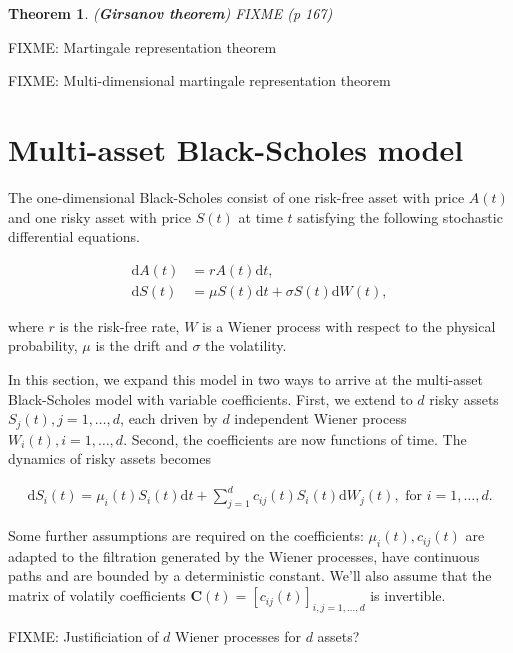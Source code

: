 \documentclass[a4paper]{article}
\newtheorem{theorem}[definition]{Theorem}
\begin{document}
\begin{theorem}
  (\textbf{Girsanov theorem}) FIXME (p 167)
\end{theorem}

FIXME: Martingale representation theorem

FIXME: Multi-dimensional martingale representation theorem

\pagebreak
\section{Multi-asset Black-Scholes model}


The one-dimensional Black-Scholes consist of one risk-free asset with price $A(t)$ and one risky asset with price $S(t)$ at time $t$ satisfying the following stochastic differential equations.

\begin{align*}
  \mathrm{d}A(t) &= r A(t) \mathrm{d}t,\\
  \mathrm{d}S(t) &= \mu S(t) \mathrm{d}t + \sigma S(t) \mathrm{d}W(t),
\end{align*}

where $r$ is the risk-free rate, $W$ is a Wiener process with respect to the physical probability, $\mu$ is the drift and $\sigma$ the volatility.

In this section, we expand this model in two ways to arrive at the multi-asset Black-Scholes model with variable coefficients. First, we extend to $d$ risky assets $S_j(t), j =  1, \ldots, d$, each driven by $d$ independent Wiener process $W_i(t), i = 1, \ldots, d$. Second, the coefficients are now functions of time. The dynamics of risky assets becomes

\begin{align}\label{eq:multi-bs-eq}
  \mathrm{d}S_i(t) = \mu_i(t) S_i(t) \mathrm{d}t + \sum_{j=1}^{d} c_{ij}(t) S_i(t) \mathrm{d}W_j(t), \text{ for } i = 1,\ldots,d.
\end{align}

Some further assumptions are required on the coefficients: $\mu_i(t), c_{ij}(t)$ are adapted to the filtration generated by the Wiener processes, have continuous paths and are bounded by a deterministic constant. We'll also assume that the matrix of volatily coefficients $\mathbf{C}(t) = [c_{ij}(t)]_{i,j=1,\ldots,d}$ is invertible.

FIXME: Justificiation of $d$ Wiener processes for $d$ assets?
\end{document}
